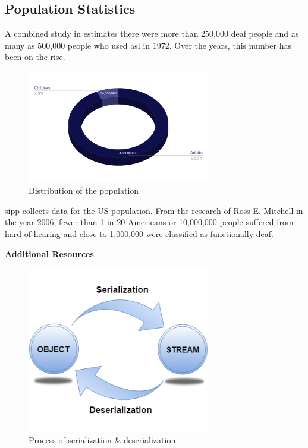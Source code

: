 \documentclass[twocolumn]{article}
\begin{document}
\subsection{Population Statistics}
A combined study in \cite{mitchell2006many} estimates there were more than 
250,000 deaf people and as many as 500,000 people who used \gls{asl} in 1972. 
Over the years, this number has been on the rise.

\begin{figure}[h]
\centering
\includegraphics[width=8cm]{./figures/distribution of the population}
\caption{Distribution of the population}
\end{figure}

\gls{sipp} collects data for the US population. From the research of 
Ross E. Mitchell \cite{mitchell2006many} in the year 2006, fewer than 1 in 20 
Americans or 10,000,000 people suffered from hard of hearing and close to 
1,000,000 were classified as functionally deaf.




\listoffigures
\listoftables

\glsaddall
\setlength{\glsdescwidth}{0.8\textwidth}
\printglossary[type=\acronymtype,title=List Of Abbreviations]

\clearpage
\LARGE{\textbf{Additional Resources}}

\begin{figure}[h]
\centering
\includegraphics[width=8cm]{./figures/serialization and deserialization}
\caption{Process of serialization \& deserialization}
\end{figure}
\end{document}
